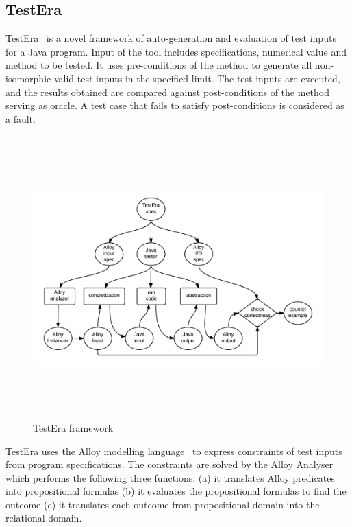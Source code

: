 \subsection{TestEra}
TestEra~\cite{marinov2001testera} is a novel framework of auto-generation and evaluation of test inputs for a Java program. Input of the tool includes specifications, numerical value and method to be tested. It uses pre-conditions of the method to generate all non-isomorphic valid test inputs in the specified limit. The test inputs are executed, and the results obtained are compared against post-conditions of the method serving as oracle. A test case that fails to satisfy post-conditions is considered as a fault. 
\bigskip
\begin{figure}[h]
	\centering
	\centerline{\includegraphics[width=15cm, height=10.9cm]{chapter2/TestEra.png}}
	\bigskip
	\caption{TestEra framework~\cite{marinov2001testera}}
	\label{fig:testera}
\end{figure}
\bigskip
TestEra uses the Alloy modelling language~\cite{jackson2001micromodularity} to express constraints of test inputs from program specifications. The constraints are solved by the Alloy Analyser~\cite{jackson2000alcoa} which performs the following three functions: (a) it translates Alloy predicates into propositional formulas%
 (b) it evaluates the propositional formulas to find the outcome (c) it translates each outcome from propositional domain into the relational domain.




